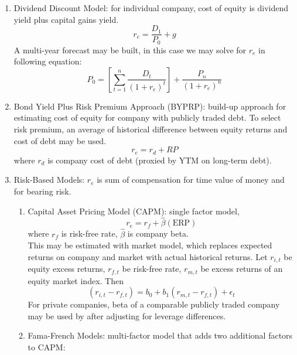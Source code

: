 \begin{method} 
\begin{enumerate}[label=\roman*.]
\setlength{\itemsep}{0pt}
\item Dividend Discount Model: for individual company, cost of equity is dividend yield plus capital gains yield.
\begin{equation}
r_e = \frac{D_1}{P_0} + g \nonumber
\end{equation}
A multi-year forecast may be built, in this case we may solve for $r_e$ in following equation:
\begin{equation}
P_0 = \left[ \sum\limits_{t=1}^n \frac{D_t}{(1+r_e)^t} \right] + \frac{P_n}{(1+r_e)^n} \nonumber
\end{equation}
\item Bond Yield Plus Risk Premium Approach (BYPRP): build-up approach for estimating cost of equity for company with publicly traded debt. To select risk premium, an average of historical difference between equity returns and cost of debt may be used.
\begin{equation}
r_e = r_d + RP \nonumber
\end{equation}
where $r_d$ is company cost of debt (proxied by YTM on long-term debt). 
\item Risk-Based Models: $r_e$ is sum of compensation for time value of money and for bearing risk.
\begin{enumerate}[label=\arabic*.]
\setlength{\itemsep}{0pt}
\item Capital Asset Pricing Model (CAPM): single factor model,
\begin{equation}
r_e = r_f + \hat{\beta}(\text{ERP}) \nonumber
\end{equation}
where $r_f$ is risk-free rate, $\hat{\beta}$ is company beta.\\
This may be estimated with market model, which replaces expected returns on company and market with actual historical returns. Let $r_{i,t}$ be equity excess returns, $r_{f,t}$ be risk-free rate, $r_{m,t}$ be excess returns of an equity market index. Then
\begin{equation}
(r_{i,t} - r_{f,t}) = b_0 + b_1 (r_{m,t} - r_{f,t}) + \epsilon_t \nonumber
\end{equation}
For private companies, beta of a comparable publicly traded company may be used by after adjusting for leverage differences.
\item Fama-French Models: multi-factor model that adds two additional factors to CAPM:

\end{enumerate}
\end{enumerate}
\end{method}
